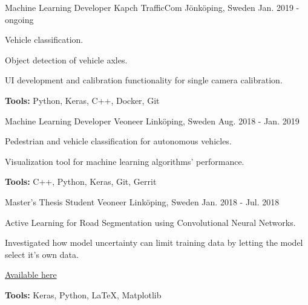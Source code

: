 

\begin{cventries}

  \cventry
    {Machine Learning Developer} %
    {Kapch TrafficCom} %
    {Jönköping, Sweden} %
    {Jan. 2019 - ongoing} %
    {
      \begin{cvitems} %
        \item {Vehicle classification.}
        \item {Object detection of vehicle axles.}
        \item {UI development and calibration functionality for single camera calibration.}
        \item {\textbf{Tools:} Python, Keras, C++, Docker, Git}
      \end{cvitems}
    }

  \cventry
    {Machine Learning Developer} %
    {Veoneer} %
    {Linköping, Sweden} %
    {Aug. 2018 - Jan. 2019} %
    {
      \begin{cvitems} %
        \item {Pedestrian and vehicle classification for autonomous vehicles.}
        \item {Visualization tool for machine learning algorithms' performance.}
        \item {\textbf{Tools:} C++, Python, Keras, Git, Gerrit}
      \end{cvitems}
    }

  \cventry
    {Master's Thesis Student} %
    {Veoneer} %
    {Linköping, Sweden} %
    {Jan. 2018 - Jul. 2018} %
    {
      \begin{cvitems} %
        \item {Active Learning for Road Segmentation using Convolutional Neural Networks.}
        \item {Investigated how model uncertainty can limit training data by letting the model select it's own data.}
        \item {\href{https://liu.diva-portal.org/smash/get/diva2:1259079/FULLTEXT01.pdf}{Available here}}
        \item {\textbf{Tools:} Keras, Python, LaTeX, Matplotlib}
      \end{cvitems}
    }


\end{cventries}
